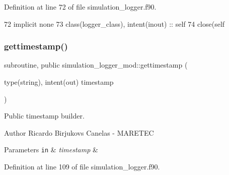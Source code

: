 Definition at line 72 of file simulation\+\_\+logger.\+f90.


\begin{DoxyCode}
72     \textcolor{keywordtype}{implicit none}
73     \textcolor{keywordtype}{class}(logger\_class), \textcolor{keywordtype}{intent(inout)} :: self            
74     \textcolor{keyword}{close}(self%
\end{DoxyCode}
\mbox{\label{namespacesimulation__logger__mod_a0326a5eeb649b041064a01d96aef0989}} 
\subsubsection{\texorpdfstring{gettimestamp()}{gettimestamp()}}
{\footnotesize\ttfamily subroutine, public simulation\+\_\+logger\+\_\+mod\+::gettimestamp (\begin{DoxyParamCaption}\item[{type(string), intent(out)}]{timestamp }\end{DoxyParamCaption})}



Public timestamp builder. 

\begin{DoxyAuthor}{Author}
Ricardo Birjukovs Canelas -\/ M\+A\+R\+E\+T\+EC 
\end{DoxyAuthor}

\begin{DoxyParams}[1]{Parameters}
\mbox{\tt in}  & {\em timestamp} & \\
\hline
\end{DoxyParams}


Definition at line 109 of file simulation\+\_\+logger.\+f90.


